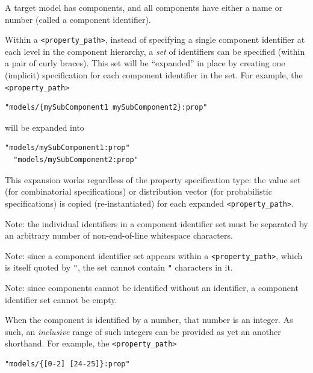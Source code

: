 \documentclass{article}
\begin{document}
A target model has components, and all components have either a name or number (called a component identifier).

Within a {\tt <property\_path>}, instead of specifying a single component identifier at each level in the component hierarchy, a \textit{set} of identifiers can be specified (within a pair of curly braces). This set will be ``expanded'' in place by creating one (implicit) specification for each component identifier in the set. For example, the {\tt <property\_path>}

\begin{lstlisting}[]
  "models/{mySubComponent1 mySubComponent2}:prop"
\end{lstlisting}

will be expanded into

\begin{lstlisting}[]
  "models/mySubComponent1:prop"
  "models/mySubComponent2:prop"
\end{lstlisting}

This expansion works regardless of the property specification type: the value set (for combinatorial specifications) or distribution vector (for probabilistic specifications) is copied (re-instantiated) for each expanded {\tt <property\_path>}.

\begin{sideblock}
Note: the individual identifiers in a component identifier set must be separated by an arbitrary number of non-end-of-line whitespace characters.
\end{sideblock}

\begin{sideblock}
Note: since a component identifier set appears within a {\tt <property\_path>}, which is itself quoted by {\tt "}, the set cannot contain {\tt "} characters in it.
\end{sideblock}

\begin{sideblock}
Note: since components cannot be identified without an identifier, a component identifier set cannot be empty.
\end{sideblock}

When the component is identified by a number, that number is an integer. As such, an \textit{inclusive} range of such integers can be provided as yet an another shorthand. For example, the {\tt <property\_path>}

\begin{lstlisting}[]
  "models/{[0-2] [24-25]}:prop"
\end{lstlisting}
\end{document}
